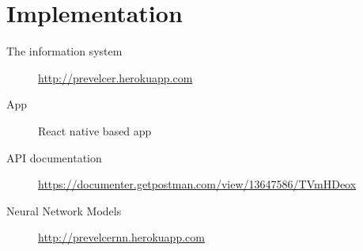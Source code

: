

\section{Implementation}

\begin{description}
    \item[The information system]   \url{http://prevelcer.herokuapp.com}
    \item[App] React native based app
    \item[API documentation] \url{https://documenter.getpostman.com/view/13647586/TVmHDeox}
    \item[Neural Network Models] \url{http://prevelcernn.herokuapp.com}
\end{description}





